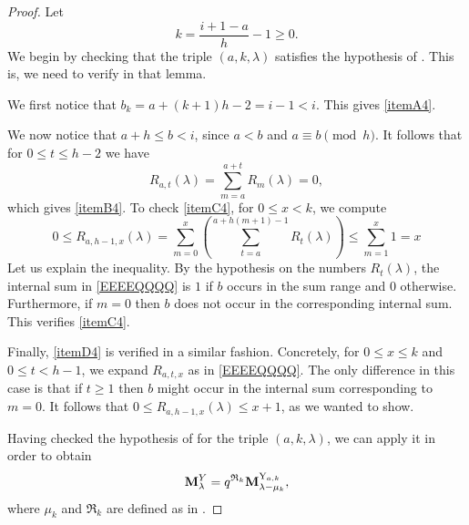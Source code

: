 \begin{proof}
Let 
\begin{equation}
       k = \frac{i+1-a}{h}-1 \geq 0 . 
\end{equation}
We begin by checking that the triple $(a,k, \lambda)$ satisfies the hypothesis of  . 
This is, we need to verify  in that lemma.  


We first notice that $b_k=a+(k+1)h-2 = i-1<i  $. This gives \cref{itemA4}. 

We now notice that $a+h \leq b < i$, since $a<b$ and $a \equiv b \pmod{h}$. 
It follows that for  $0 \leq t \leq h-2$ we have
\begin{equation}
    R_{a,t}(\lambda) = \sum_{m=a}^{a+t}R_{m}(\lambda)= 0, 
\end{equation}
which gives \cref{itemB4}. 
To check \cref{itemC4},  for $0\leq x < k$, we compute 
\begin{equation}\label{EEEEQQQQ}
  \displaystyle  0\leq  R_{a,h-1,x}(\lambda) 
    = \sum_{m=0}^{x} \left(\sum_{t=a}^{a+h(m+1)-1}R_{t}(\lambda)  \right)
    \leq  \sum_{m=1}^{x} 1 = x
\end{equation}
Let us explain the  inequality. 
By the hypothesis on the numbers $R_{t}(\lambda)$, the internal sum in \cref{EEEEQQQQ} is $1$ if $b$ occurs in the sum range and $0$ otherwise. 
Furthermore, if $m=0$ then $b$ does not occur in the corresponding internal sum. 
This verifies \cref{itemC4}. 

Finally, \cref{itemD4} is verified in a similar fashion. 
Concretely, for $0\leq x \leq k$ and $0\leq t < h-1$,  we expand $R_{a,t,x}$ as in \cref{EEEEQQQQ}.
The only difference in this case is that if $t\geq 1$ then $b$ might occur in the internal sum corresponding to $m=0$. 
It follows that  $0\leq  R_{a,h-1,x}(\lambda) \leq x +1$, as we wanted to show. 

Having checked the hypothesis of  for the triple $(a,k,\lambda)$, we can apply it in order to obtain
\begin{equation}
    \mathbf{M}_{\lambda}^{Y} = q^{\mathfrak{R}_{k}}\mathbf{M}_{\lambda - \mu_{k}}^{\mathrm{Y}_{a,k}},
\end{equation}
where $\mu_{k}$ and $\mathfrak{R}_{k}$ are defined as in .



\end{proof}
